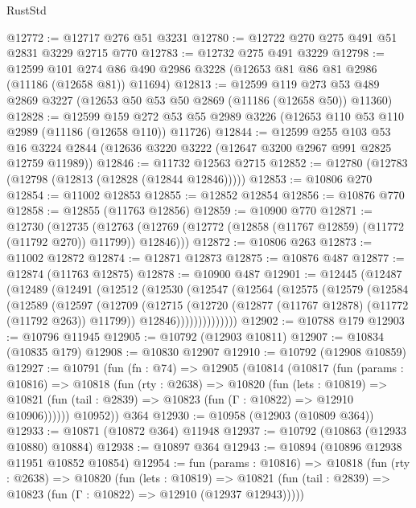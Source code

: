 \begin{lexlean}{RustStd}
\begin{coremodule}
@12772 := @12717 @276 @51 @3231
@12780 := @12722 @270 @275 @491 @51 @2831 @3229 @2715 @770
@12783 := @12732 @275 @491 @3229
@12798 := @12599
    @101
    @274
    @86
    @490
    @2986
    @3228
    (@12653 @81 @86 @81 @2986 (@11186 (@12658 @81)) @11694)
@12813 := @12599
    @119
    @273
    @53
    @489
    @2869
    @3227
    (@12653 @50 @53 @50 @2869 (@11186 (@12658 @50)) @11360)
@12828 := @12599
    @159
    @272
    @53
    @55
    @2989
    @3226
    (@12653 @110 @53 @110 @2989 (@11186 (@12658 @110)) @11726)
@12844 := @12599
    @255
    @103
    @53
    @16
    @3224
    @2844
    (@12636 @3220 @3222 (@12647 @3200 @2967 @991 @2825 @12759 @11989))
@12846 := @11732 @12563 @2715
@12852 := @12780 (@12783 (@12798 (@12813 (@12828 (@12844 @12846)))))
@12853 := @10806 @270
@12854 := @11002 @12853
@12855 := @12852 @12854
@12856 := @10876 @770
@12858 := @12855 (@11763 @12856)
@12859 := @10900 @770
@12871 := @12730
    (@12735
      (@12763 (@12769 (@12772 (@12858 (@11767 @12859) (@11772 (@11792 @270)) @11799)) @12846)))
@12872 := @10806 @263
@12873 := @11002 @12872
@12874 := @12871 @12873
@12875 := @10876 @487
@12877 := @12874 (@11763 @12875)
@12878 := @10900 @487
@12901 := @12445
    (@12487
      (@12489
        (@12491
          (@12512
            (@12530
              (@12547
                (@12564
                  (@12575
                    (@12579
                      (@12584
                        (@12589
                          (@12597
                            (@12709
                              (@12715
                                (@12720 (@12877 (@11767 @12878) (@11772 (@11792 @263)) @11799))
                                @12846))))))))))))))
@12902 := @10788 @179
@12903 := @10796 @11945
@12905 := @10792 (@12903 @10811)
@12907 := @10834 (@10835 @179)
@12908 := @10830 @12907
@12910 := @10792 (@12908 @10859)
@12927 := @10791
    (fun (fn : @74) =>
    @12905
      (@10814
        (@10817
          (fun (params : @10816) =>
          @10818
            (fun (rty : @2638) =>
            @10820
              (fun (lets : @10819) =>
              @10821 (fun (tail : @2839) => @10823 (fun (Γ : @10822) => @12910 @10906))))))
        @10952))
    @364
@12930 := @10958 (@12903 (@10809 @364))
@12933 := @10871 (@10872 @364) @11948
@12937 := @10792 (@10863 (@12933 @10880) @10884)
@12938 := @10897 @364
@12943 := @10894 (@10896 @12938 @11951 @10852 @10854)
@12954 := fun (params : @10816) =>
  @10818
    (fun (rty : @2638) =>
    @10820
      (fun (lets : @10819) =>
      @10821 (fun (tail : @2839) => @10823 (fun (Γ : @10822) => @12910 (@12937 @12943)))))

\end{coremodule}
\end{lexlean}

